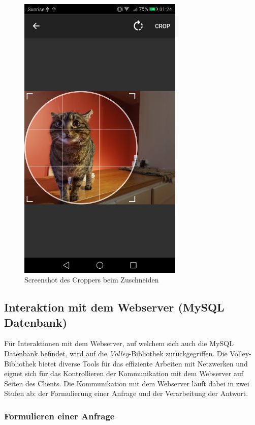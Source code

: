 \documentclass[../main.tex]{subfiles}
\begin{document}
	\begin{figure}
		\centering
		\includegraphics[width=0.7\textwidth]{./images/cropper.png}
		\caption{Screenshot des Croppers beim Zuschneiden}
		\label{cropperImage}
	\end{figure}
	
	\subsection{Interaktion mit dem Webserver (MySQL Datenbank)}
	Für Interaktionen mit dem Webserver, auf welchem sich auch die MySQL Datenbank befindet, wird auf die \emph{Volley}-Bibliothek zurückgegriffen. Die Volley-Bibliothek bietet diverse Tools für das effiziente Arbeiten mit Netzwerken und eignet sich für das Kontrollieren der Kommunikation mit dem Webserver auf Seiten des Clients. Die Kommunikation mit dem Webserver läuft dabei  in zwei Stufen ab: der Formulierung einer Anfrage und der Verarbeitung der Antwort.
	
	\subsubsection{Formulieren einer Anfrage}
	
\end{document}
